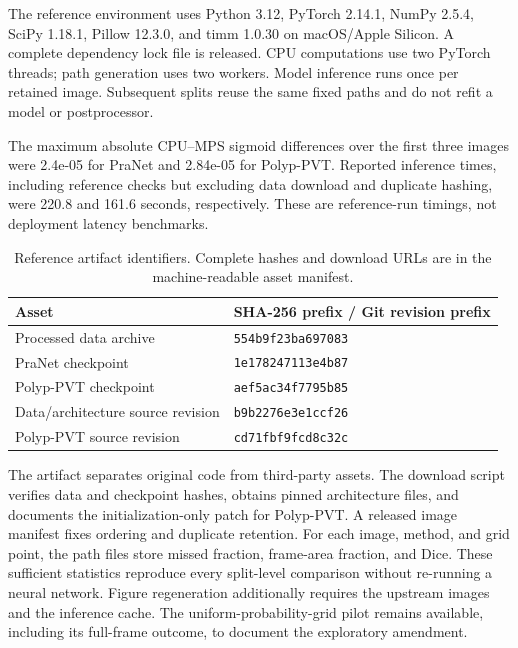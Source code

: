 The reference environment uses Python 3.12, PyTorch 2.14.1, NumPy 2.5.4, SciPy 1.18.1, Pillow 12.3.0, and timm 1.0.30 on macOS/Apple Silicon. A complete dependency lock file is released. CPU computations use two PyTorch threads; path generation uses two workers. Model inference runs once per retained image. Subsequent splits reuse the same fixed paths and do not refit a model or postprocessor.

The maximum absolute CPU--MPS sigmoid differences over the first three images were 2.4e-05 for PraNet and 2.84e-05 for Polyp-PVT. Reported inference times, including reference checks but excluding data download and duplicate hashing, were 220.8 and 161.6 seconds, respectively. These are reference-run timings, not deployment latency benchmarks.

\begin{table}[htbp]\centering\small
\caption{Reference artifact identifiers. Complete hashes and download URLs are in the machine-readable asset manifest.}
\begin{tabular}{ll}\toprule
Asset & SHA-256 prefix / Git revision prefix\\\midrule
Processed data archive & \texttt{554b9f23ba697083}\\
PraNet checkpoint & \texttt{1e178247113e4b87}\\
Polyp-PVT checkpoint & \texttt{aef5ac34f7795b85}\\
Data/architecture source revision & \texttt{b9b2276e3e1ccf26}\\
Polyp-PVT source revision & \texttt{cd71fbf9fcd8c32c}\\\bottomrule
\end{tabular}\end{table}

The artifact separates original code from third-party assets. The download script verifies data and checkpoint hashes, obtains pinned architecture files, and documents the initialization-only patch for Polyp-PVT. A released image manifest fixes ordering and duplicate retention. For each image, method, and grid point, the path files store missed fraction, frame-area fraction, and Dice. These sufficient statistics reproduce every split-level comparison without re-running a neural network. Figure regeneration additionally requires the upstream images and the inference cache. The uniform-probability-grid pilot remains available, including its full-frame outcome, to document the exploratory amendment.
